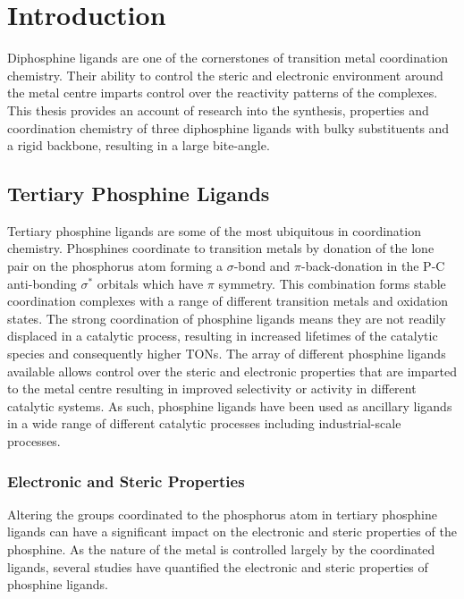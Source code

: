 
\chapter{Introduction}
\label{chapter:introduction}

Diphosphine ligands are one of the cornerstones of transition metal coordination chemistry.  Their ability to control the steric and electronic environment around the metal centre imparts control over the reactivity patterns of the complexes.  This thesis provides an account of research into the synthesis, properties and coordination chemistry of three diphosphine ligands with bulky \tBu{} substituents and a rigid backbone, resulting in a large bite-angle.  

\section{Tertiary Phosphine Ligands}

Tertiary phosphine ligands are some of the most ubiquitous in coordination chemistry.  Phosphines coordinate to transition metals by donation of the lone pair on the phosphorus atom forming a $\sigma$-bond and $\pi$-back-donation in the P-C anti-bonding $\sigma^*$ orbitals which have $\pi$ symmetry.\cite{Orpen1990}  This combination forms stable coordination complexes with a range of different transition metals and oxidation states.  The strong coordination of phosphine ligands means they are not readily displaced in a catalytic process, resulting in increased lifetimes of the catalytic species and consequently higher \glspl{TON}.  The array of different phosphine ligands available allows control over the steric and electronic properties that are imparted to the metal centre resulting in  improved selectivity or activity in different catalytic systems.  As such, phosphine ligands have been used as ancillary ligands in a wide range of different catalytic processes including industrial-scale processes.\cite{Noyori2002, Nicolaou2005, Knowles2002}

\subsection{Electronic and Steric Properties}

Altering the groups coordinated to the phosphorus atom in tertiary phosphine ligands can have a significant impact on the electronic and steric properties of the phosphine.  As the nature of the metal is controlled largely by the coordinated ligands, several studies have quantified the electronic and steric properties of phosphine ligands.  \cite{Tolman1977, Banger2009, Dunne1991, Roodt2003, Mann1980, Tiburcio2006, Tolman1970}  


